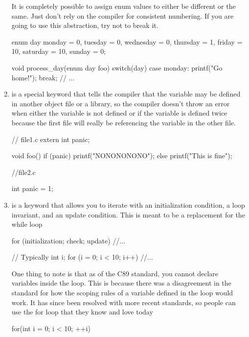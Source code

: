 \begin{enumerate}
It is completely possible to assign enum values to either be different or the same. Just don't rely on the compiler for consistent numbering. If you are going to use this abstraction, try not to break it.

\begin{code}[language=C]
enum day{ 
  monday = 0, 
  tuesday = 0, 
  wednesday = 0,
  thursday = 1, 
  friday = 10, 
  saturday = 10, 
  sunday = 0};

void process_day(enum day foo) {
  switch(day) {
    case monday:
      printf("Go home!\n"); break;
    // ...
  }
}
\end{code}

\item {} is a special keyword that tells the compiler that the variable may be defined in another object file or a library, so the compiler doesn't throw an error when either the variable is not defined or if the variable is defined twice because the first file will really be referencing the variable in the other file.

\begin{code}[language=C]
// file1.c
extern int panic;

void foo() {
  if (panic) {
    printf("NONONONONO");
  } else {
    printf("This is fine");
  }
}

//file2.c

int panic = 1;
\end{code}

\item {} is a keyword that allows you to iterate with an initialization condition, a loop invariant, and an update condition. This is meant to be a replacement for the while loop

\begin{code}[language=C]
for (initialization; check; update) {
  //...
}

// Typically
int i;
for (i = 0; i < 10; i++) {
  //...
}
\end{code}

One thing to note is that as of the C89 standard, you cannot declare variables inside the  loop. This is because there was a disagreement in the standard for how the scoping rules of a variable defined in the loop would work. It has since been resolved with more recent standards, so people can use the for loop that they know and love today

\begin{code}[language=C]
for(int i = 0; i < 10; ++i) {
  
}
\end{code}
\end{enumerate}
